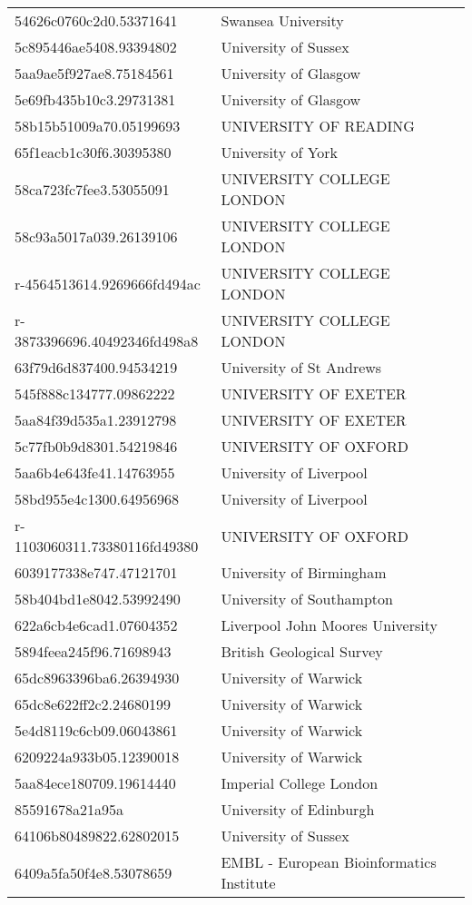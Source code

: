 \begin{tabular}{ll}
54626c0760c2d0.53371641 & Swansea University \\
5c895446ae5408.93394802 & University of Sussex \\
5aa9ae5f927ae8.75184561 & University of Glasgow \\
5e69fb435b10c3.29731381 & University of Glasgow \\
58b15b51009a70.05199693 & UNIVERSITY OF READING \\
65f1eacb1c30f6.30395380 & University of York \\
58ca723fc7fee3.53055091 & UNIVERSITY COLLEGE LONDON \\
58c93a5017a039.26139106 & UNIVERSITY COLLEGE LONDON \\
r-4564513614.9269666fd494ac & UNIVERSITY COLLEGE LONDON \\
r-3873396696.40492346fd498a8 & UNIVERSITY COLLEGE LONDON \\
63f79d6d837400.94534219 & University of St Andrews \\
545f888c134777.09862222 & UNIVERSITY OF EXETER \\
5aa84f39d535a1.23912798 & UNIVERSITY OF EXETER \\
5c77fb0b9d8301.54219846 & UNIVERSITY OF OXFORD \\
5aa6b4e643fe41.14763955 & University of Liverpool \\
58bd955e4c1300.64956968 & University of Liverpool \\
r-1103060311.73380116fd49380 & UNIVERSITY OF OXFORD \\
6039177338e747.47121701 & University of Birmingham \\
58b404bd1e8042.53992490 & University of Southampton \\
622a6cb4e6cad1.07604352 & Liverpool John Moores University \\
5894feea245f96.71698943 & British Geological Survey \\
65dc8963396ba6.26394930 & University of Warwick \\
65dc8e622ff2c2.24680199 & University of Warwick \\
5e4d8119c6cb09.06043861 & University of Warwick \\
6209224a933b05.12390018 & University of Warwick \\
5aa84ece180709.19614440 & Imperial College London \\
85591678a21a95a & University of Edinburgh \\
64106b80489822.62802015 & University of Sussex \\
6409a5fa50f4e8.53078659 & EMBL - European Bioinformatics Institute \\

\end{tabular}
